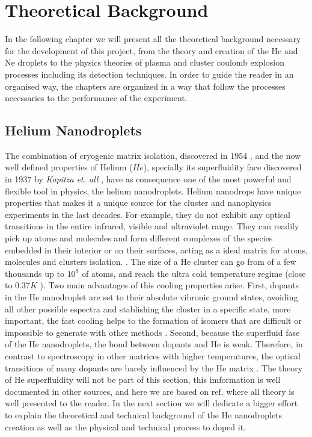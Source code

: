 \chapter{Theoretical Background}

In the following chapter we will present all the theoretical background necessary for the development of this project, from the theory and creation of the He and Ne droplets to the physics theories of plasma and cluster coulomb explosion processes including its detection techniques. In order to guide the reader in an organised way, the chapters are organized in a way that follow the processes necessaries to the performance of the experiment. 


\section{Helium Nanodroplets}

The combination of cryogenic matrix isolation, discovered in 1954 \cite{whittle_matrix_1954}, and the now well defined properties of Helium ($He$), specially its superfluidity face discovered in 1937 by \textit{Kapitza et. all}            \cite{kapitza_viscosity_1938}, have as consequence one of the most powerful and flexible tool in physics, the helium nanodroplets.
Helium nanodrops  have unique properties that makes it a unique source for the cluster and nanophysics experiments in the last decades. For example, they do not exhibit any optical transitions in the entire infrared, visible and ultraviolet range. They can readily pick up atoms and molecules and  form different complexes of the species embedded in their interior or on their surfaces, acting as a ideal matrix for atoms, molecules and clusters isolation. \cite{stienkemeier_spectroscopy_2006}\cite{toennies_superfluid_2004}.
The size of a He cluster can go from of a few thousands up to $10^{8}$ of atoms, and reach the ultra cold temperature regime (close to 0.37$K$ \cite{toennies_spectroscopy_1998})\cite{enss_low-temperature_2005}.
Two main advantages of this  cooling properties arise. First,  dopants in the He nanodroplet are set to their absolute vibronic ground states, avoiding all other possible espectra and stablishing the cluster in a specific state, more important, the fast cooling helps to the formation of isomers that are difficult or impossible to generate with other methods \cite{nauta_nonequilibrium_1999}. Second, because the superfluid fase of the He nanodroplets\cite{grebenev_superfluidity_1998}, the bond between dopants and He is weak. Therefore, in contrast to spectroscopy in other matrices with higher temperatures, the optical transitions of many dopants are barely influenced by the He matrix \cite{toennies_superfluid_2004}. 
The theory of  He superfluidity will not be part of this section, this imformation is well documented in other sources, and here we are based on ref.\cite{enss_low-temperature_2005} where all theory is well presented to the reader. In the next section we will dedicate a bigger effort to explain the theoretical and technical background of the He nanodroplets creation as well as the physical and technical process to doped it. 


